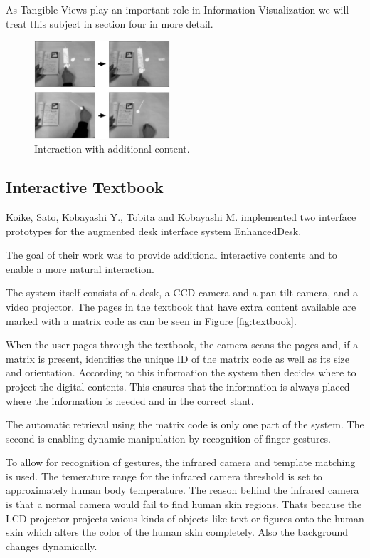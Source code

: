 As Tangible Views play an important role in Information Visualization we will treat this subject in section four in more detail.

\begin{figure}
\centering
\includegraphics[width=0.45\textwidth]{figures/InteractiveTextbook.jpg}
\caption{Interaction with additional content.}
\label{fig:textbook2}
\end{figure}

\subsection{Interactive Textbook}

Koike, Sato, Kobayashi Y., Tobita and Kobayashi M. \cite{koike00} implemented two interface prototypes for the augmented desk interface system EnhancedDesk. 

The goal of their work was to provide additional interactive contents and to enable a more natural interaction. 


The system itself consists of a desk, a CCD camera and a pan-tilt camera, and a video projector. 
The pages in the textbook that have extra content available are marked with a matrix code as can be seen in Figure \ref{fig:textbook}. 

When the user pages through the textbook, the camera scans the pages and, if a matrix is present, identifies the unique ID of the matrix code as well as its size and orientation. According to this information the system then decides where to project the digital contents. This ensures that the information is always placed where the information is needed and in the correct slant. 

The automatic retrieval using the matrix code is only one part of the system. The second is enabling dynamic manipulation by recognition of finger gestures. 

To allow for recognition of gestures, the infrared camera and template matching is used. The temerature range for the infrared camera threshold is set to approximately human body temperature. The reason behind the infrared camera is that a normal camera would fail to find human skin regions. Thats because the LCD projector projects vaious kinds of objects like text or figures onto the human skin which alters the color of the human skin completely. Also the background changes dynamically. 

